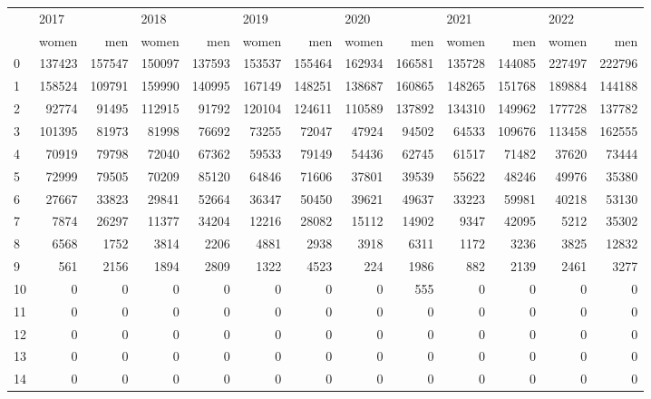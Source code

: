 \begin{tabular}{lrrrrrrrrrrrr}
\toprule
{} & \multicolumn{2}{l}{2017} & \multicolumn{2}{l}{2018} & \multicolumn{2}{l}{2019} & \multicolumn{2}{l}{2020} & \multicolumn{2}{l}{2021} & \multicolumn{2}{l}{2022} \\
{} &   women &     men &   women &     men &   women &     men &   women &     men &   women &     men &   women &     men \\
\midrule
0  &  137423 &  157547 &  150097 &  137593 &  153537 &  155464 &  162934 &  166581 &  135728 &  144085 &  227497 &  222796 \\
1  &  158524 &  109791 &  159990 &  140995 &  167149 &  148251 &  138687 &  160865 &  148265 &  151768 &  189884 &  144188 \\
2  &   92774 &   91495 &  112915 &   91792 &  120104 &  124611 &  110589 &  137892 &  134310 &  149962 &  177728 &  137782 \\
3  &  101395 &   81973 &   81998 &   76692 &   73255 &   72047 &   47924 &   94502 &   64533 &  109676 &  113458 &  162555 \\
4  &   70919 &   79798 &   72040 &   67362 &   59533 &   79149 &   54436 &   62745 &   61517 &   71482 &   37620 &   73444 \\
5  &   72999 &   79505 &   70209 &   85120 &   64846 &   71606 &   37801 &   39539 &   55622 &   48246 &   49976 &   35380 \\
6  &   27667 &   33823 &   29841 &   52664 &   36347 &   50450 &   39621 &   49637 &   33223 &   59981 &   40218 &   53130 \\
7  &    7874 &   26297 &   11377 &   34204 &   12216 &   28082 &   15112 &   14902 &    9347 &   42095 &    5212 &   35302 \\
8  &    6568 &    1752 &    3814 &    2206 &    4881 &    2938 &    3918 &    6311 &    1172 &    3236 &    3825 &   12832 \\
9  &     561 &    2156 &    1894 &    2809 &    1322 &    4523 &     224 &    1986 &     882 &    2139 &    2461 &    3277 \\
10 &       0 &       0 &       0 &       0 &       0 &       0 &       0 &     555 &       0 &       0 &       0 &       0 \\
11 &       0 &       0 &       0 &       0 &       0 &       0 &       0 &       0 &       0 &       0 &       0 &       0 \\
12 &       0 &       0 &       0 &       0 &       0 &       0 &       0 &       0 &       0 &       0 &       0 &       0 \\
13 &       0 &       0 &       0 &       0 &       0 &       0 &       0 &       0 &       0 &       0 &       0 &       0 \\
14 &       0 &       0 &       0 &       0 &       0 &       0 &       0 &       0 &       0 &       0 &       0 &       0 \\
\bottomrule
\end{tabular}
